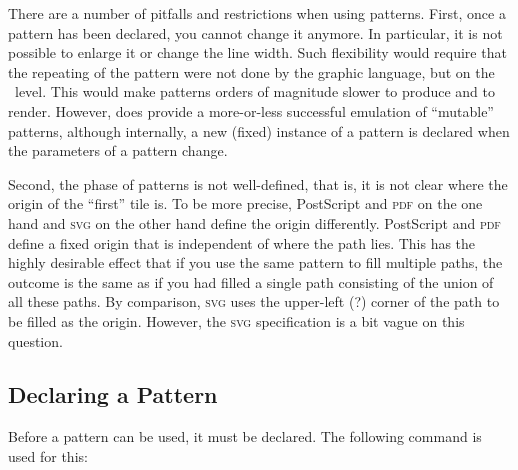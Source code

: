 There are a number of pitfalls and restrictions when using patterns. First,
once a pattern has been declared, you cannot change it anymore. In particular,
it is not possible to enlarge it or change the line width. Such flexibility
would require that the repeating of the pattern were not done by the graphic
language, but on the \pgfname\ level. This would make patterns orders of
magnitude slower to produce and to render. However, \pgfname{} does provide a
more-or-less successful emulation of ``mutable'' patterns, although internally,
a new (fixed) instance of a pattern is declared when the parameters of a
pattern change.

Second, the phase of patterns is not well-defined, that is, it is not clear
where the origin of the ``first'' tile is. To be more precise, PostScript and
\textsc{pdf} on the one hand and \textsc{svg} on the other hand define the
origin differently. PostScript and \textsc{pdf} define a fixed origin that is
independent of where the path lies. This has the highly desirable effect that
if you use the same pattern to fill multiple paths, the outcome is the same as
if you had filled a single path consisting of the union of all these paths. By
comparison, \textsc{svg} uses the upper-left (?) corner of the path to be
filled as the origin. However, the \textsc{svg} specification is a bit vague on
this question.


\subsection{Declaring a Pattern}

Before a pattern can be used, it must be declared. The following command is
used for this:


